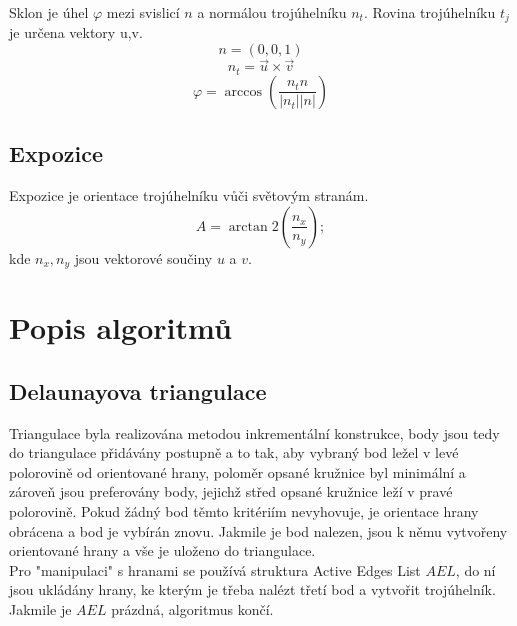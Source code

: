 \documentclass[a4paper, 12pt]{article}
\begin{document}
Sklon je úhel $\varphi$ mezi svislicí $n$ a normálou trojúhelníku $n_t$. Rovina trojúhelníku $t_j$ je určena vektory u,v.\\

\noindent$$n = (0,0,1)$$
$$n_t = \vec{u}\times \vec{v}$$
$$\varphi =\arccos(\frac{n_t  n}{|n_t| |n|})$$



\subsection{Expozice}
Expozice je orientace trojúhelníku vůči světovým stranám.\\
$$A = \arctan2(\frac{n_x}{n_y});$$ kde $n_x, n_y$ jsou vektorové součiny $u$ a $v$.



\clearpage
\section{Popis algoritmů}

\subsection{Delaunayova triangulace}
Triangulace byla realizována metodou inkrementální konstrukce, body jsou tedy do triangulace přidávány postupně a to tak, aby vybraný bod ležel v levé polorovině od orientované hrany, poloměr opsané kružnice byl minimální a zároveň jsou preferovány body, jejichž střed opsané kružnice leží v pravé polorovině. Pokud žádný bod těmto kritériím nevyhovuje, je orientace hrany obrácena a bod je vybírán znovu. Jakmile je bod nalezen, jsou k němu vytvořeny orientované hrany a vše je uloženo do triangulace.\\
Pro "manipulaci" s hranami se používá struktura Active Edges List $AEL$, do ní jsou ukládány hrany, ke kterým je třeba nalézt třetí bod a vytvořit trojúhelník. Jakmile je $AEL$ prázdná, algoritmus končí.
\end{document}
